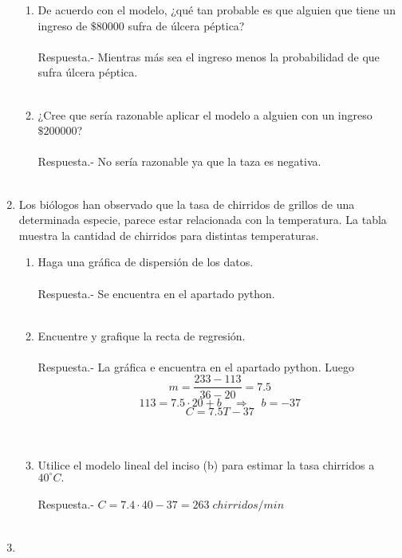 \begin{enumerate}
\begin{enumerate}[\bfseries (a)]
	\item De acuerdo con el modelo, ¿qué tan probable es que alguien que tiene un ingreso de $ \$ 80000$ sufra de úlcera péptica?\\\\
	    Respuesta.-\; Mientras más sea el ingreso menos la probabilidad de que sufra úlcera péptica.\\\\

	\item ¿Cree que sería razonable aplicar el modelo a alguien con un ingreso $\$ 200000$?\\\\
	    Respuesta.-\; No sería razonable ya que la taza es negativa.\\\\

    \end{enumerate}

    \item Los biólogos han observado que la tasa de chirridos de grillos de una determinada especie, parece estar relacionada con la temperatura. La tabla muestra la cantidad de chirridos para distintas temperaturas. \\
    \begin{enumerate}[\bfseries (a)]
	
	\item Haga una gráfica de dispersión de los datos.\\\\
	    Respuesta.- Se encuentra en el apartado python.\\\\
	
	\item Encuentre y grafique la recta de regresión.\\\\
	    Respuesta.- La gráfica e encuentra en el apartado python. Luego $$m=\dfrac{233-113}{36-20} = 7.5$$ $$113 = 7.5\cdot 20 + b \quad \Rightarrow \quad b = - 37$$ $$C = 7.5 T - 37$$\\\\
	
	\item Utilice el modelo lineal del inciso (b) para estimar la tasa chirridos a $40 ^\circ C.$\\\\
	    Respuesta.-\; $C = 7.4\cdot 40 - 37 = 263 \; chirridos/min$\\\\

    \end{enumerate}

    \item 



\end{enumerate}
